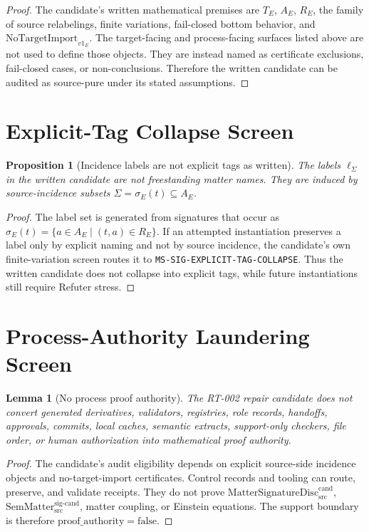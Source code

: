 \documentclass[11pt]{article}
\newcommand{\SemMatterSig}{\mathrm{SemMatter}_{\mathrm{src}}^{\mathrm{sig\text{-}cand}}}
\newcommand{\MatSigDisc}{\mathrm{MatterSignatureDisc}_{\mathrm{src}}^{\mathrm{cand}}}
\newcommand{\NoTarget}{\mathrm{NoTargetImport}_{v1}}
\newcommand{\ProofAuthFalse}{\mathrm{proof\_authority=false}}
\newtheorem{lemma}{Lemma}
\newtheorem{proposition}{Proposition}
\begin{document}
\begin{proof}
The candidate's written mathematical premises are \(T_E\), \(A_E\), \(R_E\),
the family of source relabelings, finite variations, fail-closed bottom
behavior, and \(\NoTarget_E\). The target-facing and process-facing surfaces
listed above are not used to define those objects. They are instead named as
certificate exclusions, fail-closed cases, or non-conclusions. Therefore the
written candidate can be audited as source-pure under its stated assumptions.
\end{proof}

\section{Explicit-Tag Collapse Screen}

\begin{proposition}[Incidence labels are not explicit tags as written]
The labels \(\ell_\Sigma\) in the written candidate are not freestanding
matter names. They are induced by source-incidence subsets
\(\Sigma=\sigma_E(t)\subseteq A_E\).
\end{proposition}

\begin{proof}
The label set is generated from signatures that occur as
\(\sigma_E(t)=\{a\in A_E\mid (t,a)\in R_E\}\). If an attempted instantiation
preserves a label only by explicit naming and not by source incidence, the
candidate's own finite-variation screen routes it to
\texttt{MS-SIG-EXPLICIT-TAG-COLLAPSE}. Thus the written candidate does not
collapse into explicit tags, while future instantiations still require
Refuter stress.
\end{proof}

\section{Process-Authority Laundering Screen}

\begin{lemma}[No process proof authority]
The RT-002 repair candidate does not convert generated derivatives,
validators, registries, role records, handoffs, approvals, commits, local
caches, semantic extracts, support-only checkers, file order, or human
authorization into mathematical proof authority.
\end{lemma}

\begin{proof}
The candidate's audit eligibility depends on explicit source-side incidence
objects and no-target-import certificates. Control records and tooling can
route, preserve, and validate receipts. They do not prove
\(\MatSigDisc\), \(\SemMatterSig\), matter coupling, or Einstein equations.
The support boundary is therefore \(\ProofAuthFalse\).
\end{proof}
\end{document}
